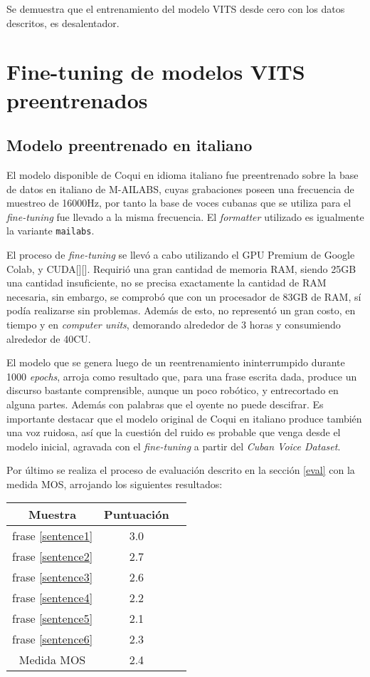Se demuestra que el entrenamiento del modelo VITS desde cero con los datos descritos, es desalentador.


\section{Fine-tuning de modelos VITS preentrenados} \label{vits_it_en}

\subsection{Modelo preentrenado en italiano}
El modelo disponible de Coqui en idioma italiano fue preentrenado sobre la base de datos en italiano de M-AILABS, cuyas grabaciones poseen una frecuencia de muestreo de 16000Hz, por tanto la base de voces cubanas que se utiliza para el \textit{fine-tuning} fue llevado a la misma frecuencia.
El \textit{formatter} utilizado es igualmente la variante \texttt{mailabs}.

El proceso de \textit{fine-tuning} se llevó a cabo utilizando el GPU Premium de Google Colab, y CUDA[\cite{cuda}][\cite{cuda1}]. Requirió una gran cantidad de memoria RAM, siendo 25GB una cantidad insuficiente, no se precisa exactamente la cantidad de RAM necesaria, sin embargo, se comprobó que con un procesador de 83GB de RAM, sí podía realizarse sin problemas. Además de esto, no representó un gran costo, en tiempo y en \textit{computer units}, demorando alrededor de 3 horas y consumiendo alrededor de 40CU.

El modelo que se genera luego de un reentrenamiento ininterrumpido durante 1000 \textit{epochs}, arroja como resultado que, para una frase escrita dada, produce un discurso bastante comprensible, aunque un poco robótico, y entrecortado en alguna partes. Además con palabras que el oyente no puede descifrar. Es importante destacar que el modelo original de Coqui en italiano produce también una voz ruidosa, así que la cuestión del ruido es probable que venga desde el modelo inicial, agravada con el \textit{fine-tuning} a partir del \textit{Cuban Voice Dataset}.

Por último se realiza el proceso de evaluación descrito en la sección \ref{eval} con la medida MOS, arrojando los siguientes resultados:

\begin{center} \begin{tabular}{ |c|c|c| } 
		\hline 
		Muestra & Puntuación \\
		\hline
		frase \ref{sentence1} & 3.0 \\
		frase \ref{sentence2} & 2.7 \\
		frase \ref{sentence3} & 2.6 \\
		frase \ref{sentence4} & 2.2 \\
		frase \ref{sentence5} & 2.1 \\
		frase \ref{sentence6} & 2.3 \\
		\hline
		Medida MOS & 2.4\\
		\hline 
	\end{tabular} 
\end{center}

